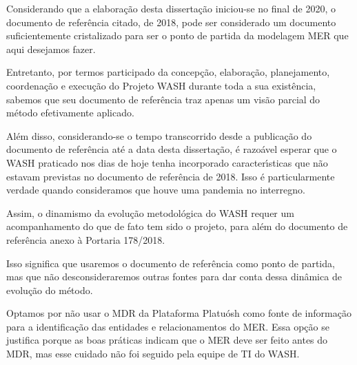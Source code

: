 \documentclass[
12pt,		%
openright,	%
twoside,  %
a4paper,			%
chapter=TITLE,		%
english,			%
french,				%
spanish,			%
brazil				%
]{USPSC-classe/USPSC}
\begin{document}
Considerando que a elabora\c{c}\~ao desta disserta\c{c}\~ao iniciou-se no final de 2020, o documento de refer\^encia citado, de 2018, pode ser considerado um documento suficientemente cristalizado para ser o ponto de partida da modelagem MER que aqui desejamos fazer.










Entretanto, por termos participado da concep\c{c}\~ao, elabora\c{c}\~ao, planejamento, coordena\c{c}\~ao e execu\c{c}\~ao do Projeto WASH durante toda a sua exist\^encia, sabemos que seu documento de refer\^encia traz apenas um vis\~ao parcial do m\'etodo efetivamente aplicado.










Al\'em disso, considerando-se o tempo transcorrido desde a publica\c{c}\~ao do documento de refer\^encia at\'e a data desta disserta\c{c}\~ao, \'e razo\'avel esperar que o WASH praticado nos dias de hoje tenha incorporado caracter\'{\i}sticas que n\~ao estavam previstas no documento de refer\^encia de 2018. Isso \'e particularmente verdade quando consideramos que houve uma pandemia no interregno.










Assim, o dinamismo da evolu\c{c}\~ao metodol\'ogica do WASH requer um acompanhamento do que de fato tem sido o projeto, para al\'em do documento de refer\^encia anexo \`a Portaria 178/2018.










Isso significa que usaremos o documento de refer\^encia como ponto de partida, mas que n\~ao desconsideraremos outras fontes para dar conta dessa din\^amica de evolu\c{c}\~ao do m\'etodo.










Optamos por n\~ao usar o MDR da Plataforma Platu\'osh como fonte de informa\c{c}\~ao para a identifica\c{c}\~ao das entidades e relacionamentos do MER. Essa op\c{c}\~ao se justifica porque as boas pr\'aticas indicam que o MER deve ser feito antes do MDR, mas esse cuidado n\~ao foi seguido pela equipe de TI do WASH.
\end{document}
